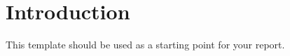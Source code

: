 \section{Introduction\label{chapter1}}
This template should be used as a starting point for your report. \citet{6166359} 